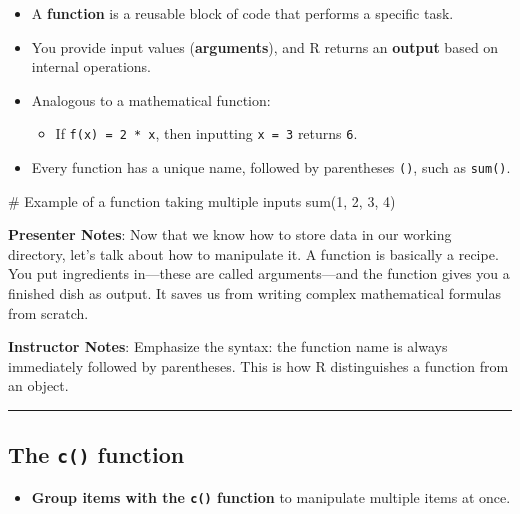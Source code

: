 \documentclass[
  letterpaper,
  DIV=11,
  numbers=noendperiod]{scrartcl}
\newenvironment{Shaded}{\begin{snugshade}}{\end{snugshade}}
\newcommand{\CommentTok}[1]{\textcolor[rgb]{0.37,0.37,0.37}{#1}}
\newcommand{\DecValTok}[1]{\textcolor[rgb]{0.68,0.00,0.00}{#1}}
\newcommand{\FunctionTok}[1]{\textcolor[rgb]{0.28,0.35,0.67}{#1}}
\newcommand{\NormalTok}[1]{\textcolor[rgb]{0.00,0.23,0.31}{#1}}
\providecommand{\tightlist}{%
  \setlength{\itemsep}{0pt}\setlength{\parskip}{0pt}}
\begin{document}
\begin{itemize}
\tightlist
\item
  A \textbf{function} is a reusable block of code that performs a
  specific task.
\item
  You provide input values (\textbf{arguments}), and R returns an
  \textbf{output} based on internal operations.
\item
  Analogous to a mathematical function:

  \begin{itemize}
  \tightlist
  \item
    If \texttt{f(x)\ =\ 2\ *\ x}, then inputting \texttt{x\ =\ 3}
    returns \texttt{6}.
  \end{itemize}
\item
  Every function has a unique name, followed by parentheses \texttt{()},
  such as \texttt{sum()}.
\end{itemize}

\begin{Shaded}
\begin{Highlighting}[]
\CommentTok{\# Example of a function taking multiple inputs}
\FunctionTok{sum}\NormalTok{(}\DecValTok{1}\NormalTok{, }\DecValTok{2}\NormalTok{, }\DecValTok{3}\NormalTok{, }\DecValTok{4}\NormalTok{)}
\end{Highlighting}
\end{Shaded}

\textbf{Presenter Notes}: Now that we know how to store data in our
working directory, let's talk about how to manipulate it. A function is
basically a recipe. You put ingredients in---these are called
arguments---and the function gives you a finished dish as output. It
saves us from writing complex mathematical formulas from scratch.

\textbf{Instructor Notes}: Emphasize the syntax: the function name is
always immediately followed by parentheses. This is how R distinguishes
a function from an object.

\begin{center}\rule{0.5\linewidth}{0.5pt}\end{center}

\subsection{\texorpdfstring{The \texttt{c()}
function}{The c() function}}\label{the-c-function}

\begin{itemize}
\tightlist
\item
  \textbf{Group items with the \texttt{c()} function} to manipulate
  multiple items at once.
\end{itemize}
\end{document}
